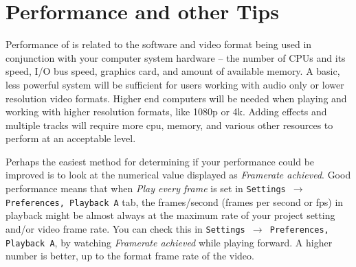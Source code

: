 \chapter{Performance and other Tips}%
\label{cha:performance_tips}

Performance of \CGG{} is related to the software and video format being used in conjunction with your computer system hardware -- the number of CPUs and its speed, I/O bus speed, graphics card, and amount of available memory. A basic, less powerful system will be sufficient for users working with audio only or lower resolution video formats.  Higher end computers will be needed when playing and working with higher resolution formats, like 1080p or 4k. Adding effects and multiple tracks will require more cpu, memory, and various other resources to 
perform at an acceptable level.

Perhaps the easiest method for determining if your performance could be improved is to look at the numerical value displayed as \textit{Framerate achieved}.  Good performance means that when \textit{Play every frame} is set 
in \texttt{Settings $\rightarrow$ Preferences, Playback A} tab, the frames/second (frames per second or fps) in playback might be almost always at the maximum rate of your project setting and/or video frame rate. You can check this in \texttt{Settings $\rightarrow$ Preferences, Playback A}, by watching \textit{Framerate achieved} while playing forward.  A higher number is better, up to the format frame rate of the video.

